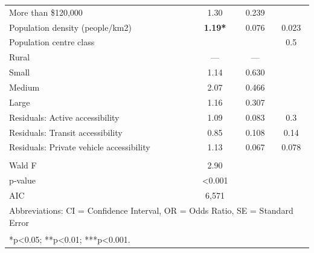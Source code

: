 \documentclass[preprint, 3p,
authoryear]{elsarticle} %
\begin{document}
\begin{table}
\begin{tabular}[t]{lccc}
\addlinespace
\hspace{1em}More than \$120,000 & 1.30 & 0.239 & \\
Population density (people/km2) & \textbf{1.19*} & 0.076 & 0.023\\
Population centre class &  &  & 0.5\\
\hspace{1em}Rural & — & — & \\
\hspace{1em}Small & 1.14 & 0.630 & \\
\addlinespace
\hspace{1em}Medium & 2.07 & 0.466 & \\
\hspace{1em}Large & 1.16 & 0.307 & \\
Residuals: Active accessibility & 1.09 & 0.083 & 0.3\\
Residuals: Transit accessibility & 0.85 & 0.108 & 0.14\\
Residuals: Private vehicle accessibility & 1.13 & 0.067 & 0.078\\
\midrule\\
\addlinespace
Wald F & 2.90 &  & \\
p‑value & <0.001 &  & \\
AIC & 6,571 &  & \\
\bottomrule
\multicolumn{4}{l}{\rule{0pt}{1em}Abbreviations: CI = Confidence Interval, OR = Odds Ratio, SE = Standard Error}\\
\multicolumn{4}{l}{\textsuperscript{} *p<0.05; **p<0.01; ***p<0.001.}\\
\end{tabular}
\end{table}

\renewcommand\refname{References}

\end{document}
